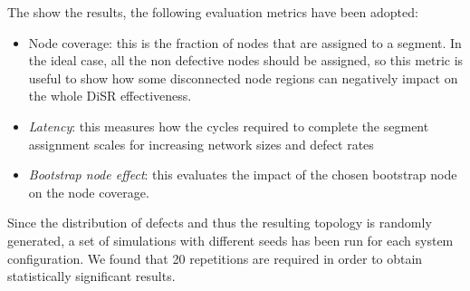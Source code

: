 The show the results, the following evaluation metrics have been adopted:
\begin{itemize}
\item{Node coverage}: this is the fraction of nodes that
are assigned to a segment. In the ideal case, all the non defective
nodes should be assigned, so this metric is useful to show how some
disconnected node regions can negatively impact on the whole DiSR
effectiveness.
\item{\emph{Latency}}: this measures how the cycles required to complete the
segment assignment scales for increasing network sizes and defect rates
\item{\emph{Bootstrap node effect}}: this evaluates the impact of the chosen
bootstrap node on the node coverage.
\end{itemize}


Since the distribution of defects and thus the resulting topology is randomly
generated, a set of simulations with different seeds has been run
for each system configuration. We found that 20 repetitions are
required in order to obtain statistically significant results.

